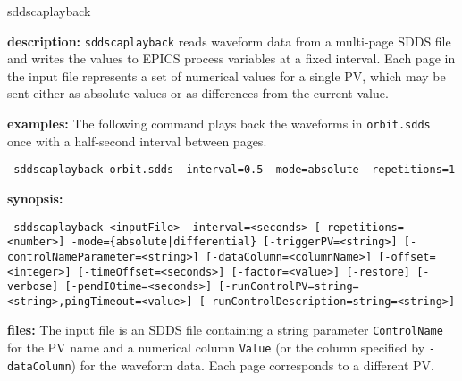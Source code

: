 %
%
\begin{sddsprog}{sddscaplayback}
\item {\bf description:}
\verb+sddscaplayback+ reads waveform data from a multi-page SDDS file and writes the values to
EPICS process variables at a fixed interval. Each page in the input file represents a set of
numerical values for a single PV, which may be sent either as absolute values or as differences
from the current value.

\item {\bf examples:}
The following command plays back the waveforms in \verb+orbit.sdds+ once with a half-second
interval between pages.
\begin{flushleft}{\tt
sddscaplayback orbit.sdds -interval=0.5 -mode=absolute -repetitions=1
}\end{flushleft}

\item {\bf synopsis:}
\begin{flushleft}{\tt
sddscaplayback <inputFile> -interval=<seconds> [-repetitions=<number>]\
-mode=\{absolute|differential\} [-triggerPV=<string>] [-controlNameParameter=<string>]\
[-dataColumn=<columnName>] [-offset=<integer>] [-timeOffset=<seconds>]\
[-factor=<value>] [-restore] [-verbose] [-pendIOtime=<seconds>]\
[-runControlPV=string=<string>,pingTimeout=<value>]\
[-runControlDescription=string=<string>]
}\end{flushleft}

\item {\bf files:}
The input file is an SDDS file containing a string parameter \verb+ControlName+ for the PV name
and a numerical column \verb+Value+ (or the column specified by \verb+-dataColumn+) for the
waveform data. Each page corresponds to a different PV.


\end{sddsprog}
